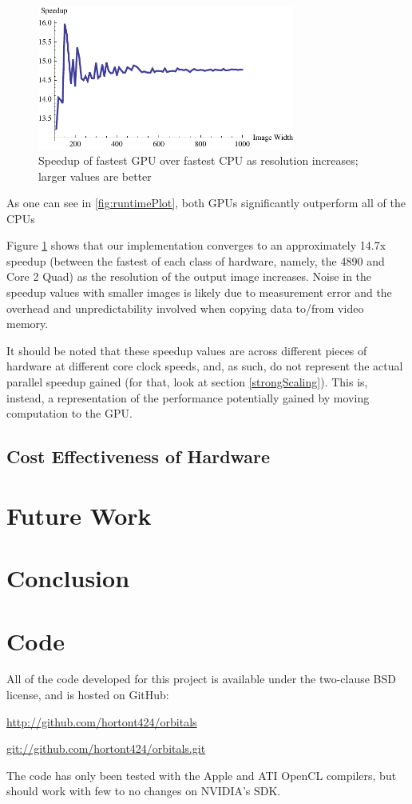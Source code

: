 \documentclass{acmsiggraph}
\begin{document}
\begin{figure}
    \includegraphics[width=84.5mm]{speedupPlot.pdf}
    \caption{Speedup of fastest GPU over fastest CPU as resolution increases; larger values are better}
    \label{fig:speedupPlot}
\end{figure}

As one can see in \ref{fig:runtimePlot}, both GPUs significantly outperform all of the CPUs

Figure \ref{fig:speedupPlot} shows that our implementation converges to an approximately 14.7x speedup (between the fastest of each class of hardware, namely, the 4890 and Core 2 Quad) as the resolution of the output image increases. Noise in the speedup values with smaller images is likely due to measurement error and the overhead and unpredictability involved when copying data to/from video memory.

It should be noted that these speedup values are across different pieces of hardware at different core clock speeds, and, as such, do not represent the actual parallel speedup gained (for that, look at section \ref{strongScaling}). This is, instead, a representation of the performance potentially gained by moving computation to the GPU.

\subsection{Cost Effectiveness of Hardware}

\section{Future Work}

\section{Conclusion}

\section{Code}

All of the code developed for this project is available under the two-clause BSD license, and is hosted on GitHub:

\url{http://github.com/hortont424/orbitals}

\url{git://github.com/hortont424/orbitals.git}

The code has only been tested with the Apple and ATI OpenCL compilers, but should work with few to no changes on NVIDIA's SDK.


\nocite{*}

\end{document}
